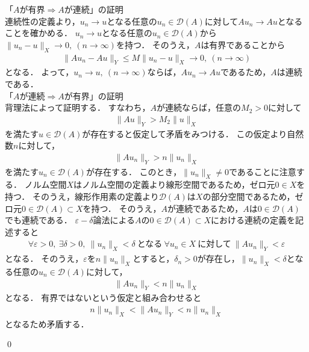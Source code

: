 \begin{Proof}
	「$A$が有界$\Rightarrow A$が連続」の証明\\
	連続性の定義より，$u_n \rightarrow u$となる任意の$u_n \in {\mathcal D}(A)$に対して$A u_n \rightarrow A u$となることを確かめる．
	$u_n \rightarrow u$となる任意の$u_n \in {\mathcal D}(A)$から$\| u_n - u \|_{X} \rightarrow 0, ~ (n \rightarrow \infty)$を持つ．
	そのうえ，$A$は有界であることから
	\begin{align*}
	 \| A u_n - A u \|_{Y} \le M \| u_n - u \|_{X} \rightarrow 0, ~ (n \rightarrow \infty)
	\end{align*}
	となる．
	よって，$u_n \rightarrow u, ~ (n \rightarrow \infty)$ならば，$A u_n \rightarrow A u$であるため，$A$は連続である．\\
	
	\noindent 「$A$が連続$\Rightarrow A$が有界」の証明\\
	背理法によって証明する．
	すなわち，$A$が連続ならば，任意の$M_2 > 0$に対して
	\begin{align*}
	 \| A u \|_{Y} > M_2 \| u \|_{X} 
	\end{align*}
	を満たす$u \in {\mathcal D}(A)$が存在すると仮定して矛盾をみつける．
	この仮定より自然数$n$に対して，
	\begin{align*}
	 \| A u_n \|_{Y} > n \| u_n \|_{X} 
	\end{align*}
	を満たす$u_n \in {\mathcal D}(A)$が存在する．
	このとき，$\| u_n \|_X \neq 0$であることに注意する．
	ノルム空間$X$はノルム空間の定義より線形空間であるため，ゼロ元$0 \in X$を持つ．
	そのうえ，線形作用素の定義より${\mathcal D}(A)$は$X$の部分空間であるため，ゼロ元$0 \in {\mathcal D}(A) \subset X$を持つ．
	そのうえ，$A$が連続であるため，$A$は$0 \in {\mathcal D}(A)$でも連続である．
	$\varepsilon - \delta$論法による$A$の$0 \in {\mathcal D}(A) \subset X$における連続の定義を記述すると
	\begin{align*}
	\forall \varepsilon > 0, ~ \exists \delta > 0, ~ \| u_n \|_{X} < \delta ~ \mbox{となる} ~ \forall u_n \in X ~ \mbox{に対して} ~ \| A u_n \|_{Y} < \varepsilon
	\end{align*}
	となる．
	そのうえ，$\varepsilon$を$n \| u_n \|_{X} $とすると，$\delta_n > 0$が存在し，$\| u_n \|_{X} < \delta$となる任意の$u_n \in {\mathcal D}(A)$に対して，
	\begin{align*}
	 \| A u_n \|_{Y} < n \| u_n \|_{X}
	\end{align*}
	となる．
	有界ではないという仮定と組み合わせると
	\begin{align*}
	n \| u_n \|_{X} < \| A u_n \|_{Y} < n \| u_n \|_{X}
	\end{align*}
	となるため矛盾する．

\qed
\end{Proof}



